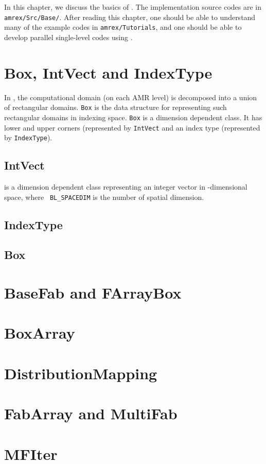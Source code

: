 In this chapter, we discuss the basics of \amrex.  The implementation
source codes are in {\tt amrex/Src/Base/}.  After reading this
chapter, one should be able to understand many of the example codes in
{\tt amrex/Tutorials}, and one should be able to develop parallel
single-level codes using \amrex.

\section{Box, IntVect and IndexType}
\label{sec:basics:box}

In \amrex, the computational domain (on each AMR level) is decomposed
into a union of rectangular domains.  {\tt Box} is the data
structure for representing such rectangular domains in indexing space.
{\tt Box} is a dimension dependent class.  It has lower and upper
corners (represented by {\tt IntVect} and an index type
(represented by {\tt IndexType}).

\subsection{IntVect}

{} is a dimension dependent class representing an
integer vector in {}-dimensional space, where {\tt
  BL\_SPACEDIM} is the number of spatial dimension.

\subsection{IndexType}

\subsection{Box}

\section{BaseFab and FArrayBox}

\section{BoxArray}

\section{DistributionMapping}

\section{FabArray and MultiFab}

\section{MFIter}

